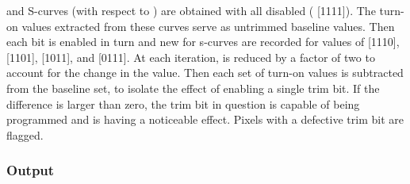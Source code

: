 and S-curves (with respect to \vcal) are obtained with all \trimbits disabled ( [1111]).
The turn-on values extracted from these curves serve as untrimmed baseline values.
Then each bit is enabled in turn and new for s-curves are recorded for values of 
 [1110],
 [1101],
 [1011], 
and  [0111].
At each iteration, \vtrim is reduced by a factor of two to account for the change in the \trimbits value.
Then each set of turn-on values is subtracted from the baseline set, to isolate the effect of enabling a single trim bit.
If the difference is larger than zero, the trim bit in question is capable of being programmed and is having a noticeable effect.
Pixels with a defective trim bit are flagged.

\subsubsection{Output}


